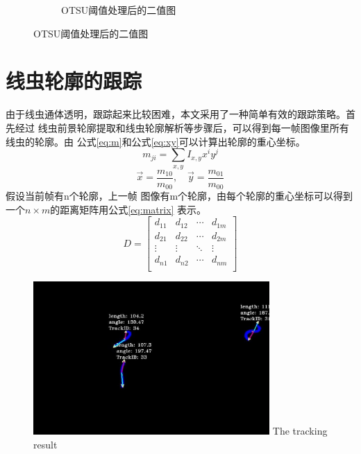 \begin{figure}[h]
\begin{subfigure}{0.4\textwidth}
	\caption{OTSU阈值处理后的二值图}\label{fig:bgsub:bin}
  \end{subfigure}
  \label{fig:bgsub}
\end{figure}
\section{线虫轮廓的跟踪}
	由于线虫通体透明，跟踪起来比较困难，本文采用了一种简单有效的跟踪策略。首先经过
	线虫前景轮廓提取和线虫轮廓解析等步骤后，可以得到每一帧图像里所有线虫的轮廓。由
	公式\ref{eq:m}和公式\ref{eq:xy}可以计算出轮廓的重心坐标。
	\begin{equation}
		m_{ji}=\sum_{x,y}I_{x,y}x^iy^j \label{eq:m}
	\end{equation}
	\begin{equation}
		\vec{x}=\frac{m_{10}}{m_{00}},\quad \vec{y}=\frac{m_{01}}{m_{00}}\label{eq:xy}
	\end{equation}
	假设当前帧有n个轮廓，上一帧
	图像有m个轮廓，由每个轮廓的重心坐标可以得到一个$n\times m$的距离矩阵用公式\ref{eq:matrix}
	表示。
		\begin{equation}
                        D=\left[
                \begin{matrix}
                 d_{11}      & d_{12}      & \cdots & d_{1m}      \\
                 d_{21}      & d_{22}      & \cdots & d_{2m}      \\
                 \vdots & \vdots & \ddots & \vdots \\
                 d_{n1}      & d_{n2}      & \cdots & d_{nm}      \\
                \end{matrix}
                \right]\label{eq:matrix}
    \end{equation}
	\begin{figure}[t]
	  \centering
	  \includegraphics[width=9cm]{figure/chap3/track.jpg}
		{The tracking result}
	  \label{fig:track}
	\end{figure}
